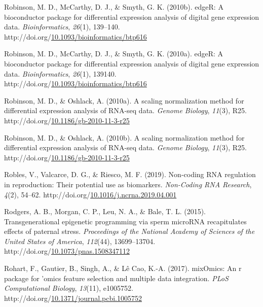 \documentclass[12pt,twoside]{reedthesis}
\newlength{\cslhangindent}
\newenvironment{CSLReferences}[2] %
 {%
  \setlength{\parindent}{0pt}
  \ifodd #1 \everypar{\setlength{\hangindent}{\cslhangindent}}\ignorespaces\fi
  \ifnum #2 > 0
  \setlength{\parskip}{#2\baselineskip}
  \fi
 }%
 {}
\begin{document}
\begin{CSLReferences}{1}{0}
\leavevmode{}%
Robinson, M. D., McCarthy, D. J., \& Smyth, G. K. (2010b). {edgeR}: A bioconductor package for differential expression analysis of digital gene expression data. \emph{Bioinformatics}, \emph{26}(1), 139--140. http://doi.org/\href{https://doi.org/10.1093/bioinformatics/btp616}{10.1093/bioinformatics/btp616}

\leavevmode{}%
Robinson, M. D., McCarthy, D. J., \& Smyth, G. K. (2010a). edgeR: A bioconductor package for differential expression analysis of digital gene expression data. \emph{Bioinformatics}, \emph{26}(1), 139140. http://doi.org/\href{https://doi.org/10.1093/bioinformatics/btp616}{10.1093/bioinformatics/btp616}

\leavevmode{}%
Robinson, M. D., \& Oshlack, A. (2010a). A scaling normalization method for differential expression analysis of RNA-seq data. \emph{Genome Biology}, \emph{11}(3), R25. http://doi.org/\href{https://doi.org/10.1186/gb-2010-11-3-r25}{10.1186/gb-2010-11-3-r25}

\leavevmode{}%
Robinson, M. D., \& Oshlack, A. (2010b). A scaling normalization method for differential expression analysis of {RNA}-seq data. \emph{Genome Biology}, \emph{11}(3), R25. http://doi.org/\href{https://doi.org/10.1186/gb-2010-11-3-r25}{10.1186/gb-2010-11-3-r25}

\leavevmode{}%
Robles, V., Valcarce, D. G., \& Riesco, M. F. (2019). Non-coding RNA regulation in reproduction: Their potential use as biomarkers. \emph{Non-Coding RNA Research}, \emph{4}(2), 54--62. http://doi.org/\href{https://doi.org/10.1016/j.ncrna.2019.04.001}{10.1016/j.ncrna.2019.04.001}

\leavevmode{}%
Rodgers, A. B., Morgan, C. P., Leu, N. A., \& Bale, T. L. (2015). Transgenerational epigenetic programming via sperm microRNA recapitulates effects of paternal stress. \emph{Proceedings of the National Academy of Sciences of the United States of America}, \emph{112}(44), 13699--13704. http://doi.org/\href{https://doi.org/10.1073/pnas.1508347112}{10.1073/pnas.1508347112}

\leavevmode{}%
Rohart, F., Gautier, B., Singh, A., \& Lê Cao, K.-A. (2017). mixOmics: An r package for 'omics feature selection and multiple data integration. \emph{PLoS Computational Biology}, \emph{13}(11), e1005752. http://doi.org/\href{https://doi.org/10.1371/journal.pcbi.1005752}{10.1371/journal.pcbi.1005752}


\end{CSLReferences}
\end{document}
